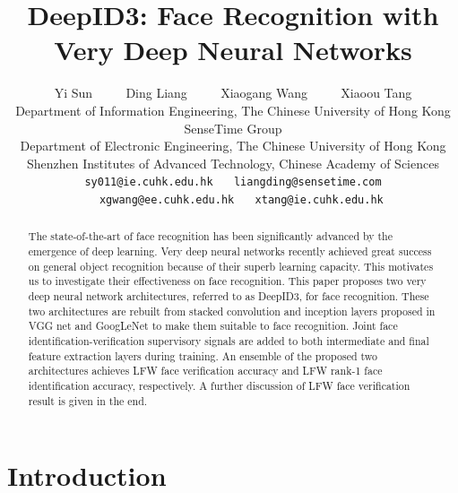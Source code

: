 \documentclass[10pt,twocolumn,letterpaper]{article}
\begin{document}
\title{DeepID3: Face Recognition with Very Deep Neural Networks}

\author{Yi Sun ~~~~ Ding Liang ~~~~  Xiaogang Wang  ~~~~ Xiaoou Tang\\
Department of Information Engineering, The Chinese University of Hong Kong\\
SenseTime Group\\
Department of Electronic Engineering, The Chinese University of Hong Kong\\
Shenzhen Institutes of Advanced Technology, Chinese Academy of Sciences\\
{\tt\small sy011@ie.cuhk.edu.hk} ~~  {\tt\small liangding@sensetime.com} \\
 ~~ {\tt\small xgwang@ee.cuhk.edu.hk} ~~  {\tt\small xtang@ie.cuhk.edu.hk}
}

\maketitle

\begin{abstract}
   The state-of-the-art of face recognition has been significantly advanced by the emergence of deep learning. Very deep neural networks recently achieved great success on general object recognition because of their superb learning capacity. This motivates us to investigate their effectiveness on face recognition.
   This paper proposes two very deep neural network architectures, referred to as DeepID3, for face recognition. These two architectures are rebuilt from stacked convolution and inception layers proposed in VGG net \cite{simonyan2014} and GoogLeNet \cite{szegedy2014} to make them suitable to face recognition. Joint face identification-verification supervisory signals are added to both intermediate and final feature extraction layers during training. An ensemble of the proposed two architectures achieves  LFW face verification accuracy and  LFW rank-1 face identification accuracy, respectively. A further discussion of LFW face verification result is given in the end.
\end{abstract}


\section{Introduction}
\end{document}

